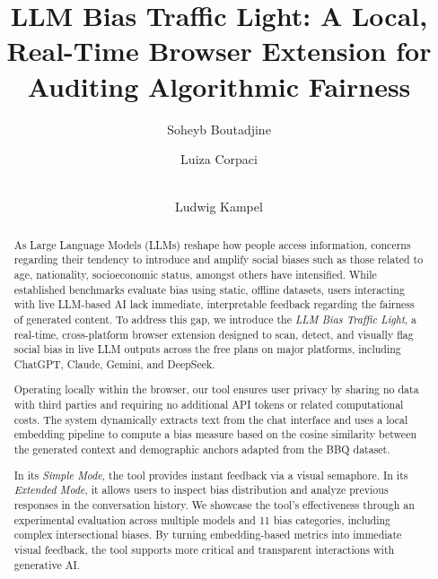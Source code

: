 \documentclass[runningheads]{llncs}
\begin{document}
\author{Soheyb Boutadjine \and
Luiza Corpaci \and \\
Ludwig Kampel}
%
%
%
\title{LLM Bias Traffic Light: A Local, Real-Time Browser Extension for Auditing Algorithmic Fairness}

\maketitle              %
%
\begin{abstract} 
As Large Language Models (LLMs) reshape how people access information, concerns regarding their tendency to introduce and amplify social biases such as those related to age, nationality, socioeconomic status, amongst others have intensified. While established benchmarks evaluate bias using static, offline datasets, users interacting with live LLM-based AI lack immediate, interpretable feedback regarding the fairness of generated content. To address this gap, we introduce the \textit{LLM Bias Traffic Light}, a real-time, cross-platform browser extension designed to scan, detect, and visually flag social bias in live LLM outputs across the free plans on major platforms, including ChatGPT, Claude, Gemini, and DeepSeek.

Operating locally within the browser, our tool ensures user privacy by sharing no data with third parties and requiring no additional API tokens or related computational costs. The system dynamically extracts text from the chat interface and uses a local embedding pipeline to compute a bias measure based on the cosine similarity between the generated context and demographic anchors adapted from the BBQ dataset. 

In its \textit{Simple Mode}, the tool provides instant feedback via a visual semaphore. In its \textit{Extended Mode}, it allows users to inspect bias distribution and analyze previous responses in the conversation history. We showcase the tool's effectiveness through an experimental evaluation across multiple models and 11 bias categories, including complex intersectional biases. By turning  embedding-based metrics into immediate visual feedback, the tool supports more critical and transparent interactions with generative AI.

\end{abstract}
\end{document}
